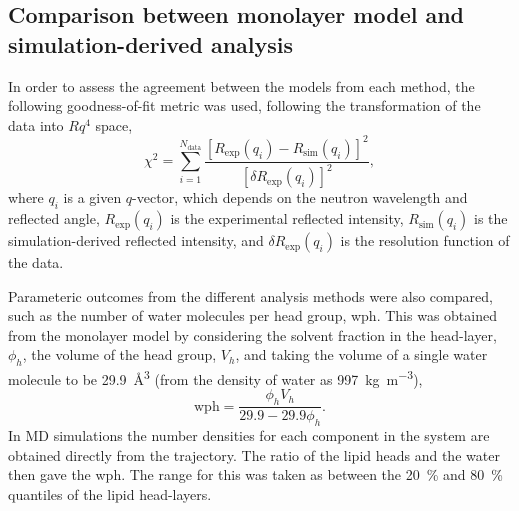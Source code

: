 \documentclass[amsmath,amssymb,twocolumn,superscriptaddress]{revtex4-1}
\begin{document}
\subsection{Comparison between monolayer model and simulation-derived analysis}
\label{sec:para}
In order to assess the agreement between the models from each method, the
following goodness-of-fit metric was used, following the transformation of
the data into $Rq^4$ space,
%
\begin{equation}
  \chi^2 = \sum_{i=1}^{N_{\text{data}}} \frac{[R_{\text{exp}}(q_i) -
  R_{\text{sim}}(q_i)]^2}{[\delta R_{\text{exp}}(q_i)]^2},
\end{equation}
%
where $q_i$ is a given $q$-vector, which depends on the neutron wavelength
and reflected angle, $R_{\text{exp}}(q_i)$ is the experimental reflected
intensity, $R_{\text{sim}}(q_i)$ is the simulation-derived reflected
intensity, and $\delta R_{\text{exp}}(q_i)$ is the resolution function of
the data.

Parameteric outcomes from the different analysis methods were also compared,
such as the number of water molecules per head group, wph.
This was obtained from the monolayer model by considering the solvent
fraction in the head-layer, $\phi_h$, the volume of the head group, $V_h$,
and taking the volume of a single water molecule to be
\SI{29.9}{\cubic\angstrom} (from the density of water as
\SI{997}{\kilo\gram\per\cubic\meter}),
%
\begin{equation}
  \text{wph} = \frac{\phi_hV_h}{29.9 - 29.9\phi_h}.
  \label{equ:wph}
\end{equation}
%
In MD simulations the number densities for each component in the system are obtained directly from the trajectory.
The ratio of the lipid heads and the water then gave the
wph.
The range for this was taken as between the \SI{20}{\percent} and
\SI{80}{\percent} quantiles of the lipid head-layers.
\end{document}
